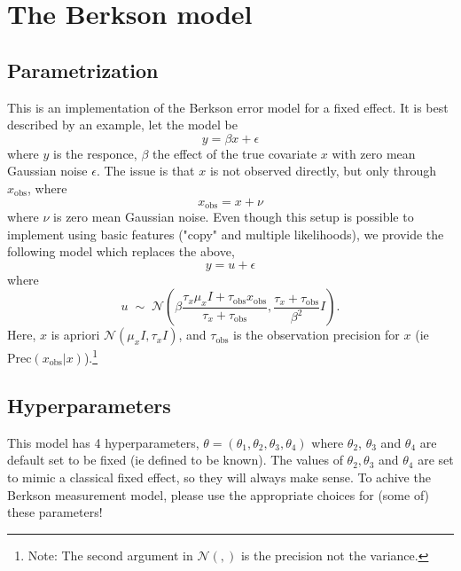\documentclass[a4paper,11pt]{article}
\begin{document}
\section*{The Berkson model}

\subsection*{Parametrization}

This is an implementation of the Berkson error model for a fixed
effect. It is best described by an example, let  the model be
\begin{displaymath}
    y = \beta x + \epsilon{}
\end{displaymath}
where $y$ is the responce, $\beta$ the effect of the true covariate
$x$ with zero mean Gaussian noise $\epsilon$. The issue is that $x$ is not observed
directly, but only through $x_{\text{obs}}$, where
\begin{displaymath}
    x_{\text{obs}} = x + \nu{}
\end{displaymath}
where $\nu$ is zero mean Gaussian noise. Even though this setup is
possible to implement using basic features ("copy" and multiple
likelihoods), we provide the following model which replaces the above,
\begin{displaymath}
    y = u + \epsilon{}
\end{displaymath}
where
\begin{displaymath}
    u \;\sim\;{\mathcal N}\left(
      \beta \frac{\tau_{x} \mu_{x} I + \tau_{\text{obs}} x_{\text{obs}}}{
          \tau_{x}+\tau_{\text{obs}}},
      \frac{\tau_{x} + \tau_{\text{obs}}}{\beta^{2}} I \right).
\end{displaymath}
Here, $x$ is apriori ${\mathcal N}(\mu_{x} {I}, \tau_{x} {I})$, and
$\tau_{\text{obs}}$ is the observation precision for $x$ (ie
$\text{Prec}(x_{\text{obs}}|x)$).\footnote{Note: The second argument in ${\mathcal
        N}(,)$ is the precision not the variance.}



\subsection*{Hyperparameters}

This model has 4 hyperparameters, $\theta = (\theta_{1}, \theta_{2},
\theta_{3}, \theta_{4})$ where $\theta_{2}$, $\theta_{3}$ and
$\theta_{4}$ are default set to be fixed (ie defined to be known). The
values of $\theta_{2}, \theta_{3}$ and $\theta_{4}$ are set to mimic a
classical fixed effect, so they will always make sense. To achive the
Berkson measurement model, please use the appropriate choices for
(some of) these parameters!
\end{document}
